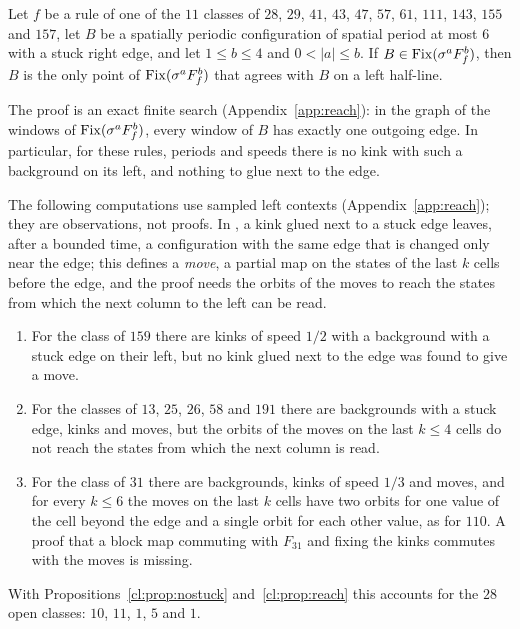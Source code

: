 \begin{proposition}\label{cl:prop:reach}
Let $f$ be a rule of one of the $11$ classes of $28$, $29$, $41$, $43$, $47$, $57$, $61$, $111$, $143$, $155$ and $157$, let $B$ be a spatially periodic configuration of spatial period at most $6$ with a stuck right edge, and let $1\le b\le4$ and $0<|a|\le b$. If $B\in\mathrm{Fix}(\sigma^aF_f^b)$, then $B$ is the only point of $\mathrm{Fix}(\sigma^aF_f^b)$ that agrees with $B$ on a left half-line.
\end{proposition}

The proof is an exact finite search (Appendix~\ref{app:reach}): in the graph of the windows of $\mathrm{Fix}(\sigma^aF_f^b)$, every window of $B$ has exactly one outgoing edge. In particular, for these rules, periods and speeds there is no kink with such a background on its left, and nothing to glue next to the edge.

\begin{remark}\label{cl:rem:reach}
The following computations use sampled left contexts (Appendix~\ref{app:reach}); they are observations, not proofs. In \cite{PaperA}, a kink glued next to a stuck edge leaves, after a bounded time, a configuration with the same edge that is changed only near the edge; this defines a \emph{move}, a partial map on the states of the last $k$ cells before the edge, and the proof needs the orbits of the moves to reach the states from which the next column to the left can be read.
\begin{enumerate}
\item For the class of $159$ there are kinks of speed $1/2$ with a background with a stuck edge on their left, but no kink glued next to the edge was found to give a move.
\item For the classes of $13$, $25$, $26$, $58$ and $191$ there are backgrounds with a stuck edge, kinks and moves, but the orbits of the moves on the last $k\le4$ cells do not reach the states from which the next column is read.
\item For the class of $31$ there are backgrounds, kinks of speed $1/3$ and moves, and for every $k\le6$ the moves on the last $k$ cells have two orbits for one value of the cell beyond the edge and a single orbit for each other value, as for $110$. A proof that a block map commuting with $F_{31}$ and fixing the kinks commutes with the moves is missing.
\end{enumerate}
With Propositions~\ref{cl:prop:nostuck} and~\ref{cl:prop:reach} this accounts for the $28$ open classes: $10$, $11$, $1$, $5$ and $1$.
\end{remark}
